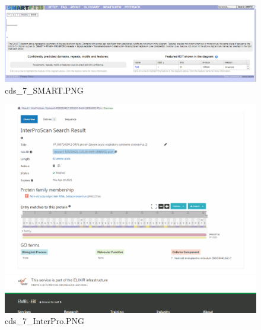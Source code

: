 \documentclass[supercite]{HustGraduPaper}
\begin{document}
	\begin{figure}[H]
		\centering
		\includegraphics[width=1\textwidth]{./material/practice2/cds_7/SMART.png}
		\caption{cds\_7\_SMART.PNG}
	\end{figure}
	\begin{figure}[H]
		\centering
		\includegraphics[width=1\textwidth]{./material/practice2/cds_7/InterPro.png}
		\caption{cds\_7\_InterPro.PNG}
	\end{figure}
\end{document}
